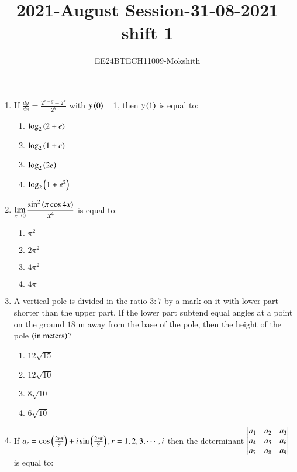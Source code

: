 \documentclass[journal]{IEEEtran}
\begin{document}

\title{2021-August Session-31-08-2021 shift 1}
\author{EE24BTECH11009-Mokshith}
{\let\newpage\relax\maketitle}
\renewcommand{\thefigure}{\theenumi}
\renewcommand{\thetable}{\theenumi}
\setlength{\intextsep}{10pt} %
\renewcommand{\thetable}{\theenumi}

\begin{enumerate}[start=16]
\item If $\frac{dy}{dx} = \frac{2^{x+y}-2^x}{2^y}$ with $y\left(0\right)=1$, then $y\left(1\right)$ is equal to:
\begin{enumerate}
\item $\log_2\left(2 + e\right)$
\item $\log_2\left(1 + e\right)$
\item $\log_2\left(2e\right)$
\item $\log_2\left(1 + e^2\right)$
\end{enumerate}
\item $\displaystyle \lim_{x \to 0} \frac{\sin^2\left(\pi\cos 4x\right)}{x^4}$
is equal to:
\begin{enumerate}
\item $\pi^2$  
\item $2\pi^2$
\item $4\pi^2$
\item $4\pi$
\end{enumerate}
\item A vertical pole is divided in the ratio $3:7$ by a mark on it with lower part shorter than the upper part. If the lower part subtend equal angles at a point on the ground $18$ m away from the base of the pole, then the height of the pole $\left(\text{in meters}\right)$?
\begin{enumerate}
\item $12\sqrt{15}$
\item$12\sqrt{10}$
\item $8\sqrt{10}$
\item $6\sqrt{10}$
\end{enumerate}
\item If $a_r = \cos\left(\frac{2r\pi}{9}\right) + i\sin\left(\frac{2r\pi}{9}\right), r= 1,2,3,\cdots,i$ then the determinant 
$\begin{vmatrix}
a_1 & a_2 & a_3 \\
a_4 & a_5 & a_6 \\
a_7 & a_8 & a_9\end{vmatrix}
$
 is equal to:
\begin{enumerate}

\end{enumerate}
\end{enumerate}
\end{document}
